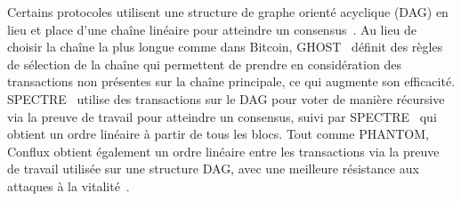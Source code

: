 {%

Certains protocoles utilisent une structure de graphe orienté acyclique (DAG) en lieu et place d'une chaîne linéaire
pour atteindre un consensus~\cite{SompolinskyZ15,SompolinskyLZ16,SompolinskyZ18,BentovHMN17,baird2016hashgraph}.
Au lieu de choisir la chaîne la plus longue comme dans Bitcoin, GHOST~\cite{SompolinskyZ15} définit des règles de
sélection de la chaîne qui permettent de prendre en considération des transactions non présentes sur la chaîne
principale, ce qui augmente son efficacité. SPECTRE~\cite{SompolinskyLZ16} utilise des transactions sur le DAG pour
voter de manière récursive via la preuve de travail pour atteindre un consensus, suivi par
SPECTRE~\cite{SompolinskyLZ16} qui obtient un ordre linéaire à partir de tous les blocs. Tout comme PHANTOM, Conflux
obtient également un ordre linéaire entre les transactions via la preuve de travail utilisée sur une structure DAG,
avec une meilleure résistance aux attaques à la vitalité~\cite{confluxLLXLC18}.

}
